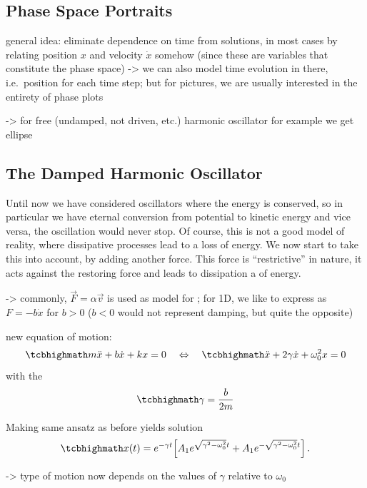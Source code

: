 \documentclass[../class_mech_main.tex]{subfiles}
\begin{document}
		\subsection{Phase Space Portraits}
general idea: eliminate dependence on time from solutions, in most cases by relating position $x$ and velocity $\dot{x}$ somehow (since these are variables that constitute the phase space) -> we can also model time evolution in there, i.e.~position for each time step; but for pictures, we are usually interested in the entirety of phase plots

-> for free (undamped, not driven, etc.) harmonic oscillator for example we get ellipse



		\subsection{The Damped Harmonic Oscillator}
Until now we have considered oscillators where the energy is conserved, so in particular we have eternal conversion from potential to kinetic energy and vice versa, the oscillation would never stop. Of course, this is not a good model of reality, where dissipative processes lead to a loss of energy. We now start to take this into account, by adding another force. This force is \enquote{restrictive} in nature, it acts against the restoring force and leads to dissipation a of energy.

-> commonly, $\vec{F} = \alpha \vec{v}$ is used as model for ; for 1D, we like to express as $F = -b \dot{x}$ for $b > 0$ ($b < 0$ would not represent damping, but quite the opposite)


new equation of motion:
\begin{equation}
	\eqbox{
		m \ddot{x} + b \dot{x} + k x = 0
	}
	\quad \Leftrightarrow \quad
	\eqbox{
		\ddot{x} + 2 \gamma \dot{x} + \omega_0^2 x = 0
	}
\end{equation}
with the 
\begin{equation}
	\eqbox{
		\gamma = \frac{b}{2m}
	}
\end{equation}


Making same ansatz as before yields solution
\begin{equation}
	\eqbox{
		x(t) = e^{-\gamma t} \qty[A_1 e^{\sqrt{\gamma^2 - \omega_0^2} t} + A_1 e^{-\sqrt{\gamma^2 - \omega_0^2} t}]
	} \, .
\end{equation}

-> type of motion now depends on the values of $\gamma$ relative to $\omega_0$
\end{document}
